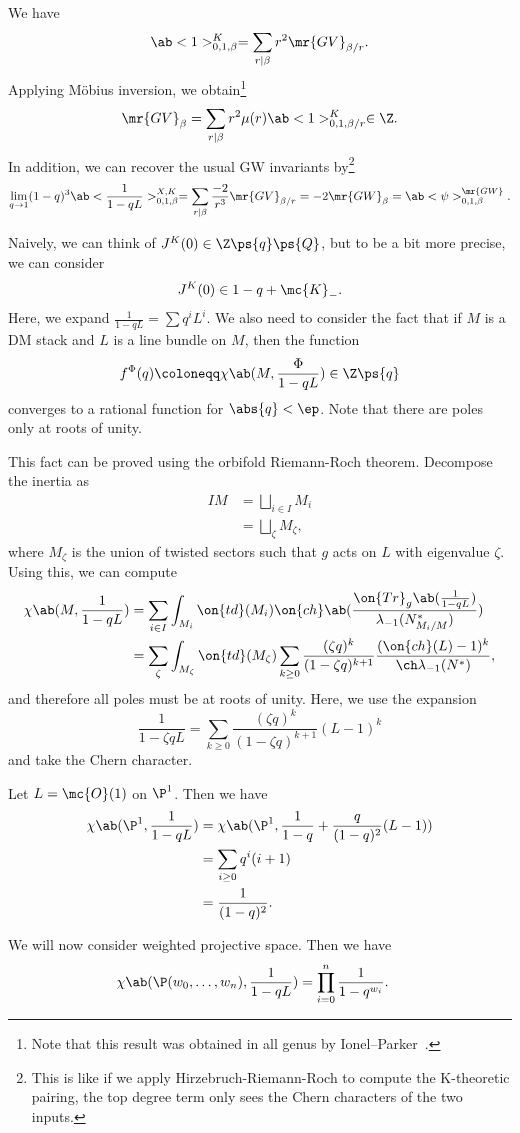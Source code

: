\begin{cor}
    We have
    \[ \ab<1>_{0,1,\beta}^K = \sum_{r \mid \beta} r^2 \mr{GV}_{\beta/r}. \]
    Applying M\"obius inversion, we obtain\footnote{Note that this result was obtained in all genus by Ionel--Parker~\cite{IonelParker2018}.}
    \[ \mr{GV}_{\beta} = \sum_{r \mid \beta} r^2 \mu(r) \ab<1>_{0,1,\beta/r}^K \in \Z. \]
    In addition, we can recover the usual GW invariants by\footnote{This is like if we apply Hirzebruch-Riemann-Roch to compute the K-theoretic pairing, the top degree term only sees the Chern characters of the two inputs.}
    \[ \lim_{q \to 1} (1-q)^3 \ab<\frac{1}{1-qL}>_{0,1,\beta}^{X,K} = \sum_{r \mid \beta} \frac{-2}{r^3} \mr{GV}_{\beta/r} = -2 \mr{GW}_{\beta} = \ab<\psi>_{0,1,\beta}^{\mr{GW}}. \]
\end{cor}

Naively, we can think of \(J^K(0) \in \Z\ps{q}\ps{Q}\), but to be a bit more precise, we can consider
\[ J^K(0) \in 1-q + \mc{K}_-. \]
Here, we expand \(\frac{1}{1-qL} = \sum q^i L^i\). 
We also need to consider the fact that if \(M\) is a DM stack and \(L\) is a line bundle on \(M\), then the function
\[ f^{\Phi}(q) \coloneqq \chi\ab(M, \frac{\Phi}{1-qL}) \in \Z \ps{q} \]
converges to a rational function for \(\abs{q} < \ep\). Note that there are poles only at roots of unity.

This fact can be proved using the orbifold Riemann-Roch theorem. Decompose the inertia as
\begin{align*}
    IM &= \bigsqcup_{i \in I} M_i \\
    &= \bigsqcup_{\zeta} M_{\zeta},
\end{align*}
where \(M_{\zeta}\) is the union of twisted sectors such that \(g\) acts on \(L\) with eigenvalue \(\zeta\). Using this, we can compute
\begin{align*}
    \chi\ab(M, \frac{1}{1-qL}) &= \sum_{i \in I} \int_{M_i} \on{td}(M_i) \on{ch} \ab(\frac{ \on{Tr}_g \ab(\frac{1}{1-qL}) }{\lambda_{-1}(N_{M_i/M}^*)}) \\
    &= \sum_{\zeta} \int_{M_{\zeta}} \on{td}(M_{\zeta}) \sum_{k \geq 0} \frac{(\zeta q)^k}{(1-\zeta q)^{k+1}} \frac{( \on{ch}(L)-1 )^k}{\ch \lambda_{-1}(N^*)},
\end{align*}
and therefore all poles must be at roots of unity. Here, we use the expansion
\[ \frac{1}{1-\zeta q L} = \sum_{k \geq 0} \frac{(\zeta q)^k}{(1-\zeta q)^{k+1}} (L-1)^k \]
and take the Chern character.

\begin{exm}
    Let \(L = \mc{O}(1)\) on \(\P^1\). Then we have
    \begin{align*}
        \chi\ab(\P^1, \frac{1}{1-qL}) &= \chi\ab(\P^1, \frac{1}{1-q} + \frac{q}{(1-q)^2}(L-1)) \\
        &= \sum_{i \geq 0} q^i (i+1) \\
        &= \frac{1}{(1-q)^2}.
    \end{align*}
\end{exm}

\begin{exm}
    We will now consider weighted projective space. Then we have
    \begin{align*}
        \chi\ab(\P(w_0, \ldots, w_n), \frac{1}{1-qL}) &= \prod_{i=0}^n \frac{1}{1-q^{w_i}}. 
    \end{align*}
\end{exm}

